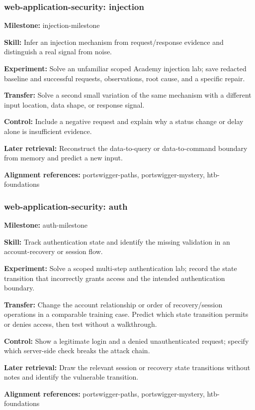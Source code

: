 \subsubsection{web-application-security: injection}
\noindent\textbf{Milestone:} injection-milestone\par
\noindent\textbf{Skill:} Infer an injection mechanism from request/response evidence and distinguish a real signal from noise.\par
\noindent\textbf{Experiment:} Solve an unfamiliar scoped Academy injection lab; save redacted baseline and successful requests, observations, root cause, and a specific repair.\par
\noindent\textbf{Transfer:} Solve a second small variation of the same mechanism with a different input location, data shape, or response signal.\par
\noindent\textbf{Control:} Include a negative request and explain why a status change or delay alone is insufficient evidence.\par
\noindent\textbf{Later retrieval:} Reconstruct the data-to-query or data-to-command boundary from memory and predict a new input.\par
\noindent\textbf{Alignment references:} portswigger-paths, portswigger-mystery, htb-foundations\par
\subsubsection{web-application-security: auth}
\noindent\textbf{Milestone:} auth-milestone\par
\noindent\textbf{Skill:} Track authentication state and identify the missing validation in an account-recovery or session flow.\par
\noindent\textbf{Experiment:} Solve a scoped multi-step authentication lab; record the state transition that incorrectly grants access and the intended authentication boundary.\par
\noindent\textbf{Transfer:} Change the account relationship or order of recovery/session operations in a comparable training case. Predict which state transition permits or denies access, then test without a walkthrough.\par
\noindent\textbf{Control:} Show a legitimate login and a denied unauthenticated request; specify which server-side check breaks the attack chain.\par
\noindent\textbf{Later retrieval:} Draw the relevant session or recovery state transitions without notes and identify the vulnerable transition.\par
\noindent\textbf{Alignment references:} portswigger-paths, portswigger-mystery, htb-foundations\par
